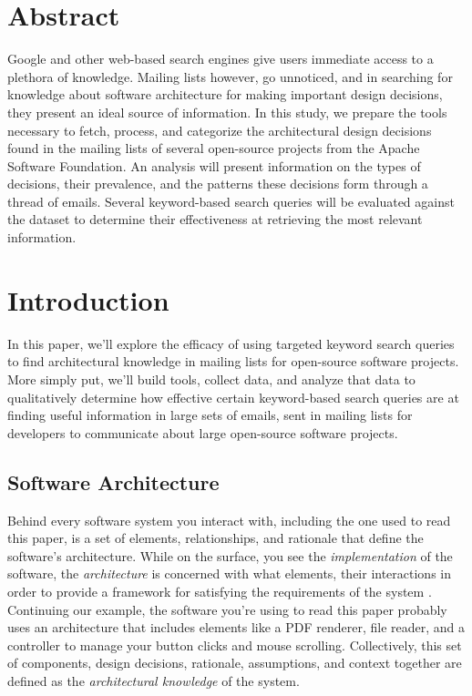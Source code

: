 \documentclass[a4paper, 12pt]{article}
\begin{document}


\section{Abstract}
	Google and other web-based search engines give users immediate access to a plethora of knowledge. Mailing lists however, go unnoticed, and in searching for knowledge about software architecture for making important design decisions, they present an ideal source of information. In this study, we prepare the tools necessary to fetch, process, and categorize the architectural design decisions found in the mailing lists of several open-source projects from the Apache Software Foundation. An analysis will present information on the types of decisions, their prevalence, and the patterns these decisions form through a thread of emails. Several keyword-based search queries will be evaluated against the dataset to determine their effectiveness at retrieving the most relevant information.



\section{Introduction}
	In this paper, we'll explore the efficacy of using targeted keyword search queries to find architectural knowledge in mailing lists for open-source software projects. More simply put, we'll build tools, collect data, and analyze that data to qualitatively determine how effective certain keyword-based search queries are at finding useful information in large sets of emails, sent in mailing lists for developers to communicate about large open-source software projects.
	
	\subsection{Software Architecture}
		Behind every software system you interact with, including the one used to read this paper, is a set of elements, relationships, and rationale that define the software's architecture. While on the surface, you see the \textit{implementation} of the software, the \textit{architecture} is concerned with what elements, their interactions in order to provide a framework for satisfying the requirements of the system \autocite{perry}. Continuing our example, the software you're using to read this paper probably uses an architecture that includes elements like a PDF renderer, file reader, and a controller to manage your button clicks and mouse scrolling. Collectively, this set of components, design decisions, rationale, assumptions, and context together are defined as the \textit{architectural knowledge} of the system\autocite{denboon}.
		
\end{document}
